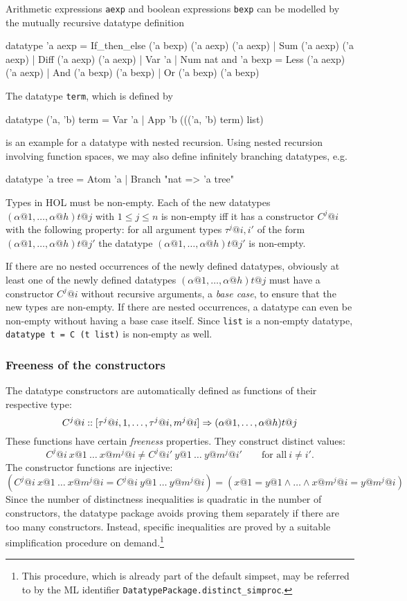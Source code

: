 Arithmetic expressions \texttt{aexp} and boolean expressions \texttt{bexp} can be modelled
by the mutually recursive datatype definition
\begin{ttbox}
datatype 'a aexp = If_then_else ('a bexp) ('a aexp) ('a aexp)
                 | Sum ('a aexp) ('a aexp)
                 | Diff ('a aexp) ('a aexp)
                 | Var 'a
                 | Num nat
and      'a bexp = Less ('a aexp) ('a aexp)
                 | And ('a bexp) ('a bexp)
                 | Or ('a bexp) ('a bexp)
\end{ttbox}
The datatype \texttt{term}, which is defined by
\begin{ttbox}
datatype ('a, 'b) term = Var 'a
                       | App 'b ((('a, 'b) term) list)
\end{ttbox}
is an example for a datatype with nested recursion. Using nested recursion
involving function spaces, we may also define infinitely branching datatypes, e.g.
\begin{ttbox}
datatype 'a tree = Atom 'a | Branch "nat => 'a tree"
\end{ttbox}

\medskip

Types in HOL must be non-empty. Each of the new datatypes
$(\alpha@1,\ldots,\alpha@h)t@j$ with $1 \leq j \leq n$ is non-empty iff it has a
constructor $C^j@i$ with the following property: for all argument types
$\tau^j@{i,i'}$ of the form $(\alpha@1,\ldots,\alpha@h)t@{j'}$ the datatype
$(\alpha@1,\ldots,\alpha@h)t@{j'}$ is non-empty.

If there are no nested occurrences of the newly defined datatypes, obviously
at least one of the newly defined datatypes $(\alpha@1,\ldots,\alpha@h)t@j$
must have a constructor $C^j@i$ without recursive arguments, a \emph{base
  case}, to ensure that the new types are non-empty. If there are nested
occurrences, a datatype can even be non-empty without having a base case
itself. Since \texttt{list} is a non-empty datatype, \texttt{datatype t = C (t
  list)} is non-empty as well.


\subsubsection{Freeness of the constructors}

The datatype constructors are automatically defined as functions of their
respective type:
\[ C^j@i :: [\tau^j@{i,1},\dots,\tau^j@{i,m^j@i}] \To (\alpha@1,\dots,\alpha@h)t@j \]
These functions have certain {\em freeness} properties.  They construct
distinct values:
\[
C^j@i~x@1~\dots~x@{m^j@i} \neq C^j@{i'}~y@1~\dots~y@{m^j@{i'}} \qquad
\mbox{for all}~ i \neq i'.
\]
The constructor functions are injective:
\[
(C^j@i~x@1~\dots~x@{m^j@i} = C^j@i~y@1~\dots~y@{m^j@i}) =
(x@1 = y@1 \land \dots \land x@{m^j@i} = y@{m^j@i})
\]
Since the number of distinctness inequalities is quadratic in the number of
constructors, the datatype package avoids proving them separately if there are
too many constructors. Instead, specific inequalities are proved by a suitable
simplification procedure on demand.\footnote{This procedure, which is already part
of the default simpset, may be referred to by the ML identifier
\texttt{DatatypePackage.distinct_simproc}.}


